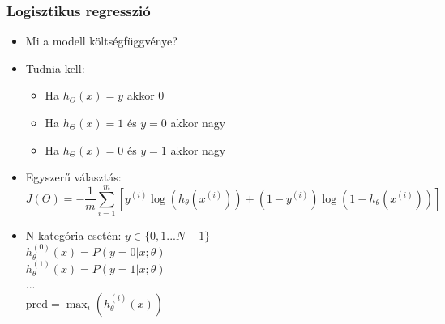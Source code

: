 \documentclass{beamer}
\begin{document}
\begin{frame}
\frametitle{Logisztikus regresszió}
\begin{itemize}
  \setlength{\itemsep}{12pt}
  \item Mi a modell költségfüggvénye?
  \item Tudnia kell: 
  	\begin{itemize}
  		\item Ha $h_\Theta(x)=y$ akkor $0$
  		\item Ha $h_\Theta(x)=1$ és $y=0$ akkor nagy
  		\item Ha $h_\Theta(x)=0$ és $y=1$ akkor nagy
  	\end{itemize}
  \item Egyszerű választás:
\begin{equation*}
J(\Theta)=- \frac{1}{m} \displaystyle \sum_{i=1}^m [y^{(i)}\log (h_\theta (x^{(i)})) + (1 - y^{(i)})\log (1 - h_\theta(x^{(i)}))]
\end{equation*}
\item N kategória esetén: 
	$ y \in \lbrace0, 1 ... N-1\rbrace $ \\
	$h_\theta^{(0)}(x) = P(y = 0 | x ; \theta)$\\
	$h_\theta^{(1)}(x) = P(y = 1 | x ; \theta)$\\ ...\\
	$\mathrm{pred} = \max_i( h_\theta ^{(i)}(x) )$
\end{itemize}

\end{frame}
\end{document}
